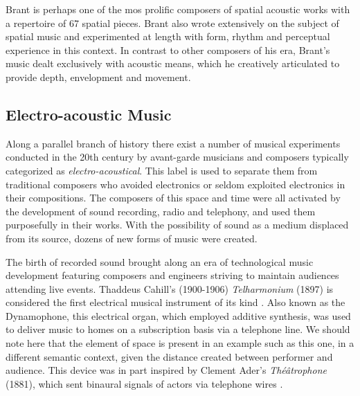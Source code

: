 Brant is perhaps one of the mos prolific composers of spatial acoustic works with a repertoire of 67 spatial pieces. Brant also wrote extensively on the subject of spatial music and experimented at length with form, rhythm and perceptual experience in this context. In contrast to other composers of his era, Brant's music dealt exclusively with acoustic means, which he creatively articulated to provide depth, envelopment and movement.  


\subsection{Electro-acoustic Music} \label{subsec:elec_acoustic_mus}

Along a parallel branch of history there exist a number of musical experiments conducted in the 20th century by avant-garde musicians and composers typically categorized as \textit{electro-acoustical}. This label is used to separate them from traditional composers who avoided electronics or seldom exploited electronics in their compositions. The composers of this space and time were all activated by the development of sound recording, radio and telephony, and used them purposefully in their works. With the possibility of sound as a medium displaced from its source, dozens of new forms of music were created.

The birth of recorded sound brought along an era of technological music development featuring composers and engineers striving to maintain audiences attending live events. Thaddeus Cahill's (1900-1906) \textit{Telharmonium} (1897) is considered the first electrical musical instrument of its kind \cite{bode1984history}. Also known as the Dynamophone, this electrical organ, which employed additive synthesis, was used to deliver music to homes on a subscription basis via a telephone line. We should note here that the element of space is present in an example such as this one, in a different semantic context, given the distance created between performer and audience. This device was in part inspired by Clement Ader's \textit{Théâtrophone} (1881), which sent binaural signals of actors via telephone wires \cite{TheTelh3:online}.

